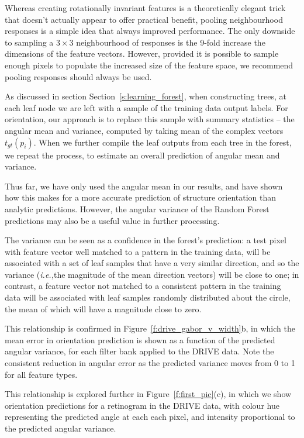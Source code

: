 \documentclass{IEEEtran}
\def\ie{\emph{i.e.,}}
\newcommand{\fref}[1]{Figure~\ref{#1}}
\newcommand{\sref}[1]{Section~\ref{#1}}
\begin{document}
Whereas creating rotationally invariant features is a theoretically elegant trick that doesn't actually appear to offer practical benefit, pooling neighbourhood responses is a simple idea that always improved performance. The only downside to sampling a $3\times3$ neighbourhood of responses is the 9-fold increase the dimensions of the feature vectors. However, provided it is possible to sample enough pixels to populate the increased size of the feature space, we recommend pooling responses should always be used.

As discussed in section \sref{s:learning_forest}, when constructing trees, at each leaf node we are left with a sample of the training data output labels. For orientation, our approach is to replace this sample with summary statistics -- the angular mean and variance, computed by taking mean of the complex vectors $t_{gt}(p_i)$. When we further compile the leaf outputs from each tree in the forest, we repeat the process, to estimate an overall prediction of angular mean and variance.

Thus far, we have only used the angular mean in our results, and have shown how this makes for a more accurate prediction of structure orientation than analytic predictions. However, the angular variance of the Random Forest predictions may also be a useful value in further processing.

The variance can be seen as a confidence in the forest's prediction: a test pixel with feature vector well matched to a pattern in the training data, will be associated with a set of leaf samples that have a very similar direction, and so the variance (\ie the magnitude of the mean direction vectors) will be close to one; in contrast, a feature vector not matched to a consistent pattern in the training data will be associated with leaf samples randomly distributed about the circle, the mean of which will have a magnitude close to zero.

This relationship is confirmed in \fref{f:drive_gabor_v_width}b, in which the mean error in orientation prediction is shown as a function of the predicted angular variance, for each filter bank applied to the DRIVE data. Note the consistent reduction in angular error as the predicted variance moves from 0 to 1 for all feature types.

This relationship is explored further in \fref{f:first_pic}(c), in which we show orientation predictions for a retinogram in the DRIVE data, with colour hue representing the predicted angle at each each pixel, and intensity proportional to the predicted angular variance.
\end{document}
